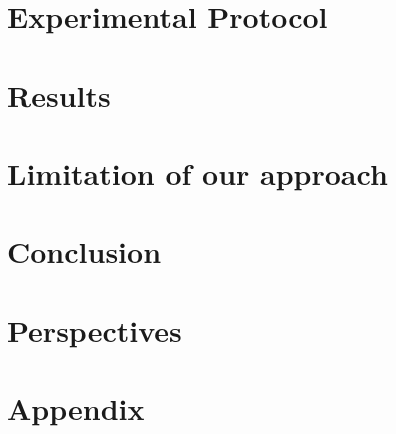 \documentclass[oneside, a4paper, onecolumn, 11pt]{article}
\begin{document}




\section{Experimental Protocol}


\section{Results}

\section{Limitation of our approach}

\section{Conclusion}

\section{Perspectives}

\newpage
\nocite{*}



\newpage
\appendix

\section{Appendix}
\label{sec:appendix}
\end{document}

